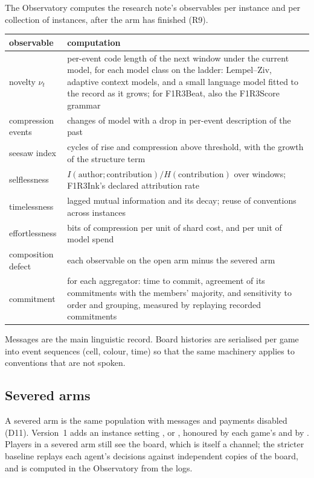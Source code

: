\documentclass[11pt,a4paper]{article}
\begin{document}
The Observatory computes the research note's observables per instance and per collection of
instances, after the arm has finished (R9).

\begin{center}\small
\begin{tabularx}{\linewidth}{@{}l>{\raggedright\arraybackslash}X@{}}
\toprule
observable & computation \\
\midrule
novelty $\nu_t$ & per-event code length of the next window under the current model, for each
  model class on the ladder: Lempel--Ziv, adaptive context models, and a small language model fitted
  to the record as it grows; for F1R3Beat, also the F1R3Score grammar \\
compression events & changes of model with a drop in per-event description of the past \\
seesaw index & cycles of rise and compression above threshold, with the growth of the structure term \\
selflessness & $I(\text{author};\text{contribution})/H(\text{contribution})$ over windows; F1R3Ink's
  declared attribution rate \\
timelessness & lagged mutual information and its decay; reuse of conventions across instances \\
effortlessness & bits of compression per unit of shard cost, and per unit of model spend \\
composition defect & each observable on the open arm minus the severed arm \\
commitment & for each aggregator: time to commit, agreement of its commitments with the members'
  majority, and sensitivity to order and grouping, measured by replaying recorded commitments \\
\bottomrule
\end{tabularx}
\end{center}

Messages are the main linguistic record. Board histories are serialised per game into event
sequences (cell, colour, time) so that the same machinery applies to conventions that are not
spoken.

\subsection{Severed arms}

A severed arm is the same population with messages and payments disabled (D11). Version~1 adds an
instance setting ,  or , honoured by each game's
 and by . Players in a severed arm still see the board, which is
itself a channel; the stricter baseline replays each agent's decisions against independent copies of
the board, and is computed in the Observatory from the logs.
\end{document}
